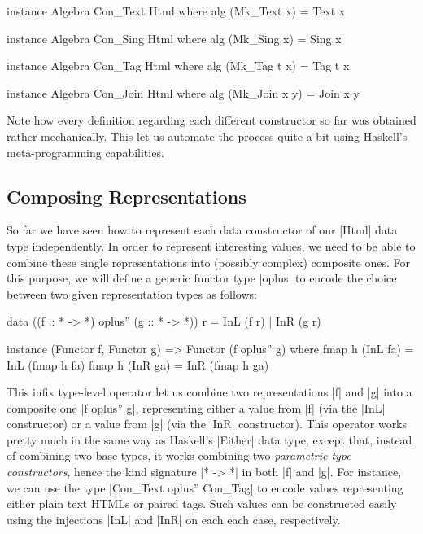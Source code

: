 \begin{code}
instance Algebra Con_Text Html where
  alg (Mk_Text x) = Text x

instance Algebra Con_Sing Html where
  alg (Mk_Sing x) = Sing x

instance Algebra Con_Tag Html where
  alg (Mk_Tag t x) = Tag t x

instance Algebra Con_Join Html where
  alg (Mk_Join x y) = Join x y
\end{code}


Note how every definition regarding each different constructor so far was
obtained rather mechanically.
%
This let us automate the process quite a bit using Haskell's meta-programming
capabilities.


%
\subsection{Composing Representations}

So far we have seen how to represent each data constructor of our |Html| data
type independently.
%
In order to represent interesting values, we need to be able to combine these
single representations into (possibly complex) composite ones.
%
For this purpose, we will define a generic functor type |oplus| to encode the
choice between two given representation types as follows:

\begin{code}
data ((f :: * -> *) oplus'' (g :: * -> *)) r = InL (f r) | InR (g r)

instance (Functor f, Functor g) => Functor (f oplus'' g)
  where  fmap h (InL fa) = InL (fmap h fa)
         fmap h (InR ga) = InR (fmap h ga)

\end{code}
%
This infix type-level operator let us combine two representations |f| and |g|
into a composite one |f oplus'' g|, representing either a value from |f| (via
the |InL| constructor) or a value from |g| (via the |InR| constructor).
%
This operator works pretty much in the same way as Haskell's |Either| data type,
except that, instead of combining two base types, it works combining two
\emph{parametric type constructors}, hence the kind signature |* -> *| in both
|f| and |g|.
%
For instance, we can use the type |Con_Text oplus'' Con_Tag| to encode values
representing either plain text HTMLs or paired tags.
%
Such values can be constructed easily using the injections |InL| and |InR| on
each each case, respectively.



